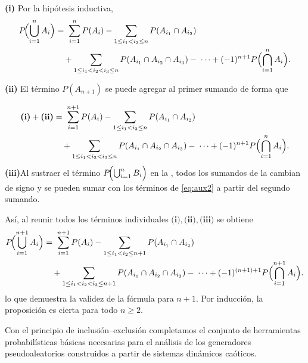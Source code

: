 \documentclass[../Main.tex]{subfiles}
\begin{document}
\begin{demostracion}{}{}
\noindent\textbf{(i)}
Por la hipótesis inductiva,  
\begin{equation}
\begin{aligned}
P\!\Bigl(\bigcup_{i=1}^{n} A_i\Bigr)
  &=\;
    \sum_{i=1}^{n} P(A_i)
    - \sum_{1\le i_1<i_2\le n} P(A_{i_1}\cap A_{i_2}) \\
  &\quad
    + \sum_{1\le i_1<i_2<i_3\le n} P(A_{i_1}\cap A_{i_2}\cap A_{i_3})
    -\; \cdots
    + (-1)^{n+1} P\Bigl(\bigcap_{i=1}^{n} A_i\Bigr).
\end{aligned}
\end{equation}

\noindent\textbf{(ii)} El término \(P(A_{n+1})\) se puede agregar al primer sumando de forma que

\begin{equation}
\begin{aligned}
\textbf{(i)}+\textbf{(ii)}
  &=\;
    \sum_{i=1}^{n+1} P(A_i)
    - \sum_{1\le i_1<i_2\le n} P(A_{i_1}\cap A_{i_2}) \\
  &\quad
    + \sum_{1\le i_1<i_2<i_3\le n} P(A_{i_1}\cap A_{i_2}\cap A_{i_3})
    -\; \cdots
    + (-1)^{n+1} P\Bigl(\bigcap_{i=1}^{n} A_i\Bigr).
\end{aligned}
\label{eq:aux2}
\end{equation}
\noindent\textbf{(iii)}Al sustraer el término \(P\!\Bigl(\bigcup_{i=1}^{n}B_i\Bigr)\) en la , todos los sumandos de la  cambian de signo y se pueden sumar con los términos de \ref{eq:aux2} a partir del segundo sumando.

Así, al reunir todos los términos individuales $\textbf{(i)},\textbf{(ii)},\textbf{(iii)}$ se obtiene
\begin{equation}
\begin{aligned}
P\!\Bigl(\bigcup_{i=1}^{n+1} A_i\Bigr)
  &=\;
    \sum_{i=1}^{n+1} P(A_i)
    - \sum_{1\le i_1<i_2\le n+1} P(A_{i_1}\cap A_{i_2}) \\
  &\quad
    + \sum_{1\le i_1<i_2<i_3\le n+1} P(A_{i_1}\cap A_{i_2}\cap A_{i_3})
    -\; \cdots
    + (-1)^{(n+1)+1} P\Bigl(\bigcap_{i=1}^{n+1} A_i\Bigr).
\end{aligned}
\end{equation}
lo que demuestra la validez de la fórmula para \(n+1\).
Por inducción, la proposición es cierta para todo \(n\ge 2\).
\end{demostracion}

Con el principio de inclusión–exclusión completamos el conjunto de
herramientas probabilísticas básicas necesarias para el análisis de los generadores pseudoaleatorios construidos a partir de
sistemas dinámicos caóticos.
\end{document}
